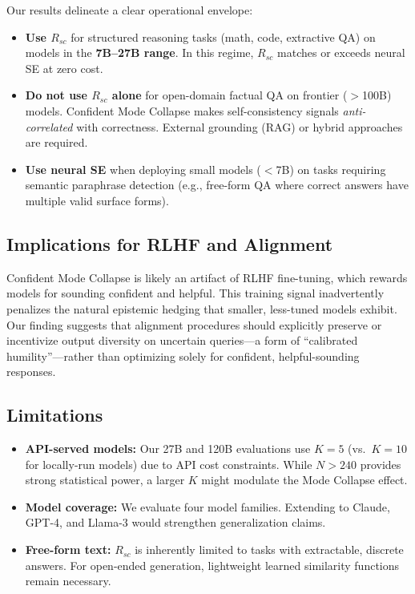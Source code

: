 \documentclass[11pt]{article}
\begin{document}
Our results delineate a clear operational envelope:

\begin{itemize}
    \item \textbf{Use $R_{sc}$} for structured reasoning tasks (math, code, extractive QA) on models in the \textbf{7B--27B range}. In this regime, $R_{sc}$ matches or exceeds neural SE at zero cost.
    \item \textbf{Do not use $R_{sc}$ alone} for open-domain factual QA on frontier ($>$100B) models. Confident Mode Collapse makes self-consistency signals \textit{anti-correlated} with correctness. External grounding (RAG) or hybrid approaches are required.
    \item \textbf{Use neural SE} when deploying small models ($<$7B) on tasks requiring semantic paraphrase detection (e.g., free-form QA where correct answers have multiple valid surface forms).
\end{itemize}

\subsection{Implications for RLHF and Alignment}

Confident Mode Collapse is likely an artifact of RLHF fine-tuning, which rewards models for sounding confident and helpful. This training signal inadvertently penalizes the natural epistemic hedging that smaller, less-tuned models exhibit. Our finding suggests that alignment procedures should explicitly preserve or incentivize output diversity on uncertain queries---a form of ``calibrated humility''---rather than optimizing solely for confident, helpful-sounding responses.

\subsection{Limitations}

\begin{itemize}
    \item \textbf{API-served models:} Our 27B and 120B evaluations use $K=5$ (vs.\ $K=10$ for locally-run models) due to API cost constraints. While $N > 240$ provides strong statistical power, a larger $K$ might modulate the Mode Collapse effect.
    \item \textbf{Model coverage:} We evaluate four model families. Extending to Claude, GPT-4, and Llama-3 would strengthen generalization claims.
    \item \textbf{Free-form text:} $R_{sc}$ is inherently limited to tasks with extractable, discrete answers. For open-ended generation, lightweight learned similarity functions remain necessary.
\end{itemize}
\end{document}
